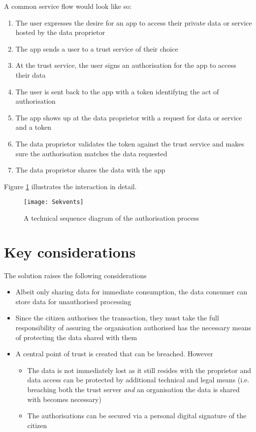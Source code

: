\documentclass[nobib]{tufte-handout}
\begin{document}
A common service flow would look like so:
\begin{enumerate}
	\item The user expresses the desire for an app to access their private data or service hosted by the data proprietor 
	\item The app sends a user to a trust service of their choice
	\item At the trust service, the user signs an authorisation for the app to access their data
	\item The user is sent back to the app with a token identifying the act of authorisation
	\item The app shows up at the data proprietor with a request for data or service and a token
	\item The data proprietor validates the token against the trust service and makes sure the authorisation matches the data requested
	\item The data proprietor shares the data with the app
\end{enumerate}

Figure \ref{fig:seq} illustrates the interaction in detail.

\begin{figure}[h]
  \texttt{[image: Sekvents]}
  \caption{A technical sequence diagram of the authorisation process}
  \label{fig:seq}
\end{figure}

\section{Key considerations}
The solution raises the following considerations
\begin{itemize}
	\item Albeit only sharing data for immediate consumption, the data consumer can store data for unauthorised processing
	\item Since the citizen authorises the transaction, they must take the full responsibility of assuring the organisation authorised has the necessary means of protecting the data shared with them
	\item A central point of trust is created that can be breached. However
	\begin{itemize}
		\item The data is not immediately lost as it still resides with the proprietor and data access can be protected by additional technical and legal means (i.e. breaching both the trust server \emph{and} an organisation the data is shared with becomes necessary)
		\item The authorisations can be secured via a personal digital signature of the citizen
	\end{itemize}
\end{itemize}
\end{document}
